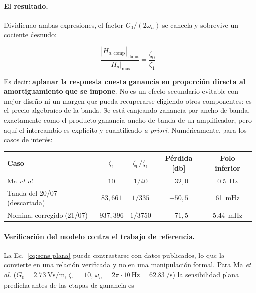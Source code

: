\paragraph{El resultado.} Dividiendo ambas expresiones, el factor $G_0/(2\omega_n)$ se
cancela y sobrevive un cociente desnudo:

\begin{equation}
\boxed{\ \frac{|H_{a,\mathrm{comp}}|_{\text{plana}}}{|H_a|_{\max}}
=\frac{\zeta_0}{\zeta_1}\ }
\label{eq:costo-ganancia}
\end{equation}

Es decir: \textbf{aplanar la respuesta cuesta ganancia en proporci\'on directa al
amortiguamiento que se impone}. No es un efecto secundario evitable con mejor dise\~no ni
un margen que pueda recuperarse eligiendo otros componentes: es el precio algebraico de
la banda. Se est\'a canjeando ganancia por ancho de banda, exactamente como el producto
ganancia--ancho de banda de un amplificador, pero aqu\'i el intercambio es expl\'icito y
cuantificado \emph{a priori}. Num\'ericamente, para los casos de inter\'es:

\begin{center}\footnotesize
\begin{tabular}{@{}lcccc@{}}
\toprule
Caso & $\zeta_1$ & $\zeta_0/\zeta_1$ & P\'erdida [\si{\decibel}] & Polo inferior \\
\midrule
Ma \emph{et al.}~\cite{Ma2023} & $10$ & $1/40$ & $-32{,}0$ & \SI{0.5}{\hertz} \\
Tanda del 20/07 (descartada) & $83{,}661$ & $1/335$ & $-50{,}5$ & \SI{61}{\milli\hertz} \\
Nominal corregido (21/07) & $937{,}396$ & $1/3750$ & $-71{,}5$ & \SI{5.44}{\milli\hertz} \\
\bottomrule
\end{tabular}
\end{center}

\paragraph{Verificaci\'on del modelo contra el trabajo de referencia.} La
Ec.~\eqref{eq:sens-plana} puede contrastarse con datos publicados, lo que la convierte en
una relaci\'on verificada y no en una manipulaci\'on formal. Para Ma \emph{et al.}
($G_0=\SI{2.73}{\volt\second\per\meter}$, $\zeta_1=10$,
$\omega_n=2\pi\cdot\SI{10}{\hertz}=\SI{62.83}{\per\second}$) la sensibilidad plana
predicha antes de las etapas de ganancia es

